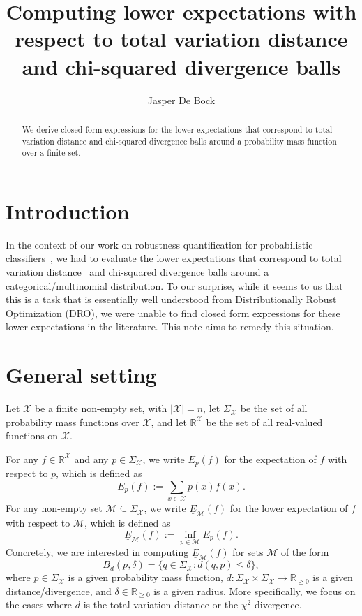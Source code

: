 \documentclass{article}
\title{Computing lower expectations with respect to total variation distance and chi-squared divergence balls}
\author{Jasper De Bock}
\date{}
\begin{document}
\maketitle

\begin{abstract}
We derive closed form expressions for the lower expectations that correspond to total variation distance and chi-squared divergence balls around a probability mass function over a finite set.
\end{abstract}

\section{Introduction}
In the context of our work on robustness quantification for probabilistic classifiers~\cite{detavernier2025robustness}, we had to evaluate the lower expectations that correspond to total variation distance~\cite{gibbsdistances} and chi-squared divergence \cite{gibbsdistances} balls around a categorical/multinomial distribution. To our surprise, while it seems to us that this is a task that is essentially well understood from Distributionally Robust Optimization (DRO), we were unable to find closed form expressions for these lower expectations in the literature. This note aims to remedy this situation.

\section{General setting}

Let $\mathcal{X}$ be a finite non-empty set, with $|\mathcal{X}|=n$, let $\Sigma_\mathcal{X}$ be the set of all probability mass functions over $\mathcal{X}$, and let $\mathbb{R}^\mathcal{X}$ be the set of all real-valued functions on $\mathcal{X}$.

For any $f\in\mathbb{R}^\mathcal{X}$ and any $p\in\Sigma_\mathcal{X}$, we write $E_p(f)$ for the expectation of $f$ with respect to $p$, which is defined as
\begin{equation*}
    E_p(f):=\sum_{x\in\mathcal{X}}p(x)f(x).
\end{equation*}
For any non-empty set $\mathcal{M}\subseteq\Sigma_\mathcal{X}$, we write $\underline{E}_\mathcal{M}(f)$ for the lower expectation of $f$ with respect to $\mathcal{M}$, which is defined as \begin{equation*}
    \underline{E}_\mathcal{M}(f):=\inf_{p\in\mathcal{M}}E_p(f).
\end{equation*}
Concretely, we are interested in computing $\underline{E}_\mathcal{M}(f)$ for sets $\mathcal{M}$ of the form
\begin{equation*}
    B_d(p,\delta)=\{q\in\Sigma_\mathcal{X}:d(q,p)\leq\delta\},
\end{equation*}where $p\in\Sigma_\mathcal{X}$ is a given probability mass function, $d:\Sigma_\mathcal{X}\times\Sigma_\mathcal{X}\to\mathbb{R}_{\geq0}$ is a given distance/divergence, and $\delta\in\mathbb{R}_{\geq0}$ is a given radius. More specifically, we focus on the cases where $d$ is the total variation distance or the $\chi^2$-divergence.
\end{document}
